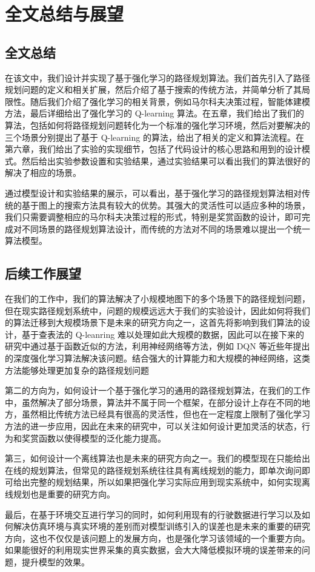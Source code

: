 \documentclass{standalone}
\begin{document}
\chapter{全文总结与展望}
\section{全文总结}
在该文中，我们设计并实现了基于强化学习的路径规划算法。我们首先引入了路径规划问题的定义和相关扩展，然后介绍了基于搜索的传统方法，并简单分析了其局限性。随后我们介绍了强化学习的相关背景，例如马尔科夫决策过程，智能体建模方法，最后详细给出了强化学习的 Q-learning 算法。在五章，我们给出了我们的算法，包括如何将路径规划问题转化为一个标准的强化学习环境，然后对要解决的三个场景分别提出了基于 Q-learning 的算法，给出了相关的定义和算法流程。在第六章，我们给出了实验的实现细节，包括了代码设计的核心思路和用到的设计模式。然后给出实验参数设置和实验结果，通过实验结果可以看出我们的算法很好的解决了相应的场景。\par
通过模型设计和实验结果的展示，可以看出，基于强化学习的路径规划算法相对传统的基于图上的搜索方法具有较大的优势。其强大的灵活性可以适应多种的场景，我们只需要调整相应的马尔科夫决策过程的形式，特别是奖赏函数的设计，即可完成对不同场景的路径规划算法设计，而传统的方法对不同的场景难以提出一个统一算法模型。
\section{后续工作展望}
在我们的工作中，我们的算法解决了小规模地图下的多个场景下的路径规划问题，但在现实路径规划系统中，问题的规模远远大于我们的实验设计，因此如何将我们的算法迁移到大规模场景下是未来的研究方向之一，这首先将影响到我们算法的设计，基于查表法的 Q-leanring 难以处理如此大规模的数据，因此可以在接下来的研究中通过基于函数近似的方法，利用神经网络等方法，例如 DQN 等近些年提出的深度强化学习算法解决该问题。结合强大的计算能力和大规模的神经网络，这类方法能够处理更加复杂的路径规划问题\par
第二的方向为，如何设计一个基于强化学习的通用的路径规划算法，在我们的工作中，虽然解决了部分场景，算法并不属于同一个框架，在部分设计上存在不同的地方，虽然相比传统方法已经具有很高的灵活性，但也在一定程度上限制了强化学习方法的进一步应用，因此在未来的研究中，可以关注如何设计更加灵活的状态，行为和奖赏函数以使得模型的泛化能力提高。\par
第三，如何设计一个离线算法也是未来的研究方向之一。我们的模型现在只能给出在线的规划算法，但常见的路径规划系统往往具有离线规划的能力，即单次询问即可给出完整的规划结果，所以如果把强化学习实际应用到现实系统中，如何实现离线规划也是重要的研究方向。\par
最后，在基于环境交互进行学习的同时，如何利用现有的行驶数据进行学习以及如何解决仿真环境与真实环境的差别而对模型训练引入的误差也是未来的重要的研究方向，这也不仅仅是该问题上的发展方向，也是强化学习该领域的一个重要方向。如果能很好的利用现实世界采集的真实数据，会大大降低模拟环境的误差带来的问题，提升模型的效果。
\end{document}

